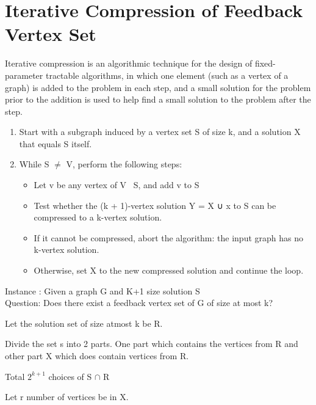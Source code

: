 
\section{Iterative Compression of Feedback Vertex Set}

Iterative compression is an algorithmic technique for the design of fixed-parameter tractable algorithms,
in which one element (such as a vertex of a graph) is added to the problem in each step, 
and a small solution for the problem prior to the addition is used to help find a small 
solution to the problem after the step.

\begin{enumerate}
        \item Start with a subgraph induced by a vertex set S of size k, and a solution X 
        that equals S itself.
        \item While S $\neq$ V, perform the following steps:
        \begin{itemize}
                \item Let v be any vertex of V \ S, and add v to S
                \item Test whether the (k + 1)-vertex solution Y = X ∪ {x} to S can
                 be compressed to a k-vertex solution.
                \item If it cannot be compressed, abort the algorithm: the input graph has no 
                k-vertex solution.
                \item Otherwise, set X to the new compressed solution and continue
                 the loop.
        \end{itemize}
\end{enumerate}



Instance : Given a graph G and K+1 size solution S \\
Question: Does there exist a feedback vertex set of G of size at most k?

Let the solution set of size atmost k be R.

Divide the set s into 2 parts. One part which contains the vertices from R and other part X which does 
contain vertices from R.

Total $2^{k+1}$ choices of S $\cap$ R

Let r number of vertices be in X.

